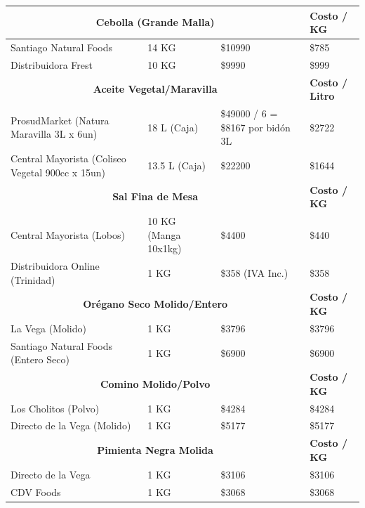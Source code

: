 \documentclass[12pt]{article}
\begin{document}
\begin{longtable}{|| m{4cm} | m{2.5cm} | m{3cm} | m{3cm} ||}
        \multicolumn{3}{||c|}{\textbf{Cebolla (Grande Malla)}} & \textbf{Costo / KG} \\ [0.5ex] \hline \hline
        Santiago Natural Foods & 14 KG & \$\num{10990} & \$\num{785} \\ \hline
        Distribuidora Frest & 10 KG & \$\num{9990} & \$\num{999} \\ [1ex] \hline \hline

        \multicolumn{3}{||c|}{\textbf{Aceite Vegetal/Maravilla}} & \textbf{Costo / Litro} \\ [0.5ex] \hline \hline
        ProsudMarket (Natura Maravilla 3L x 6un) & 18 L (Caja) & \$\num{49000} / 6 = \$\num{8167} por bidón 3L & \$\num{2722} \\ \hline %
        Central Mayorista (Coliseo Vegetal 900cc x 15un) & 13.5 L (Caja) & \$\num{22200} & \$\num{1644} \\ [1ex] \hline \hline
        
        \multicolumn{3}{||c|}{\textbf{Sal Fina de Mesa}} & \textbf{Costo / KG} \\ [0.5ex] \hline \hline
        Central Mayorista (Lobos) & 10 KG (Manga 10x1kg) & \$\num{4400} & \$\num{440} \\ \hline
        Distribuidora Online (Trinidad) & 1 KG & \$\num{358} (IVA Inc.) & \$\num{358} \\ [1ex] \hline \hline

        \multicolumn{3}{||c|}{\textbf{Orégano Seco Molido/Entero}} & \textbf{Costo / KG} \\ [0.5ex] \hline \hline
        La Vega (Molido) & 1 KG & \$\num{3796} & \$\num{3796} \\ \hline
        Santiago Natural Foods (Entero Seco) & 1 KG & \$\num{6900} & \$\num{6900} \\ [1ex] \hline \hline

        \multicolumn{3}{||c|}{\textbf{Comino Molido/Polvo}} & \textbf{Costo / KG} \\ [0.5ex] \hline \hline
        Los Cholitos (Polvo) & 1 KG & \$\num{4284} & \$\num{4284} \\ \hline
        Directo de la Vega (Molido) & 1 KG & \$\num{5177} & \$\num{5177} \\ [1ex] \hline \hline

        \multicolumn{3}{||c|}{\textbf{Pimienta Negra Molida}} & \textbf{Costo / KG} \\ [0.5ex] \hline \hline
        Directo de la Vega & 1 KG & \$\num{3106} & \$\num{3106} \\ \hline
        CDV Foods & 1 KG & \$\num{3068} & \$\num{3068} \\ [1ex] \hline \hline


\end{longtable}
\end{document}

